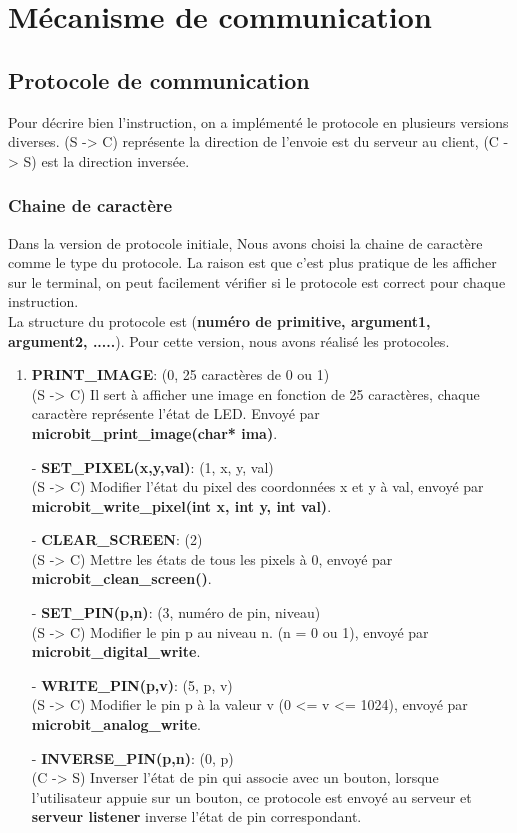 \documentclass[14px]{article}
\begin{document}
	
	\pagestyle{fancy}
	\rhead{\thepage}
	\fancyfoot{}
	
	\section{Mécanisme de communication}
	\subsection{Protocole de communication}
	Pour décrire bien l'instruction, on a implémenté le protocole en plusieurs versions diverses. (S -> C) représente la direction de l'envoie est du serveur au client, (C -> S) est la direction inversée.
	
	\subsubsection{Chaine de caractère}
	Dans la version de protocole initiale, Nous avons choisi la chaine de caractère comme le type du protocole. La raison est que c'est plus pratique de les afficher sur le terminal, on peut facilement vérifier si le protocole est correct pour chaque instruction. \\
	La structure du protocole est (\textbf{numéro de primitive, argument1, argument2, .....}).
	Pour cette version, nous avons réalisé les protocoles.
	\begin{enumerate}
		\item \textbf{PRINT\_IMAGE}: (0, 25 caractères de 0 ou 1)\\
		(S -> C) Il sert à afficher une image en fonction de 25 caractères, chaque caractère représente l'état de LED. Envoyé par \textbf{microbit\_print\_image(char* ima)}.
		\item[-] \textbf{SET\_PIXEL(x,y,val)}: (1, x, y, val)\\
		(S -> C) Modifier l'état du pixel des coordonnées x et y à val, envoyé par \textbf{microbit\_write\_pixel(int x, int y, int val)}.
		\item[-] \textbf{CLEAR\_SCREEN}: (2)\\
		(S -> C) Mettre les états de tous les pixels à 0, envoyé par \textbf{microbit\_clean\_screen()}.
		\item[-] \textbf{SET\_PIN(p,n)}: (3, numéro de pin, niveau)\\
		(S -> C) Modifier le pin p au niveau n. (n = 0 ou 1), envoyé par \textbf{microbit\_digital\_write}.
		\item[-] \textbf{WRITE\_PIN(p,v)}: (5, p, v)\\
		(S -> C) Modifier le pin p à la valeur v (0 <= v <= 1024), envoyé par \textbf{microbit\_analog\_write}.\\
		
		\item[-] \textbf{INVERSE\_PIN(p,n)}: (0, p)\\
		(C -> S) Inverser l'état de pin qui associe avec un bouton, lorsque l'utilisateur appuie sur un bouton, ce protocole est envoyé au serveur et \textbf{serveur listener} inverse l'état de pin correspondant.
	\end{enumerate}
	
\end{document}
